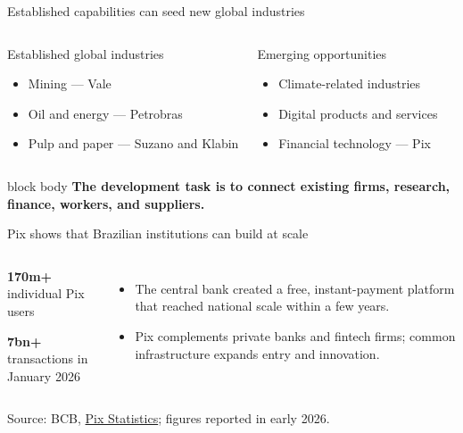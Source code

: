 \documentclass[10pt,aspectratio=169]{beamer}
\newcommand{\source}[1]{%
  \par\vfill{\tiny\color{MidGray}Source: #1}}
\newcommand{\muted}[1]{\textcolor{MidGray}{#1}}
\newcommand{\question}[1]{%
  \begin{beamercolorbox}[rounded=true,sep=0.55em,wd=\textwidth]{block body}
    \centering\large\textbf{#1}
  \end{beamercolorbox}}
\begin{document}
\begin{frame}{Established capabilities can seed new global industries}
  \begin{columns}[T,onlytextwidth]
      \begin{block}{Established global industries}
        \begin{itemize}
          \item Mining --- Vale
          \item Oil and energy --- Petrobras
          \item Pulp and paper --- Suzano and Klabin
        \end{itemize}
      \end{block}
      \begin{exampleblock}{Emerging opportunities}
        \begin{itemize}
          \item Climate-related industries
          \item Digital products and services
          \item Financial technology --- Pix
        \end{itemize}
      \end{exampleblock}
  \end{columns}
  \vspace{.4cm}
  \question{The development task is to connect existing firms, research, finance, workers, and suppliers.}
\end{frame}

\begin{frame}{Pix shows that Brazilian institutions can build at scale}
  \begin{columns}[T,onlytextwidth]
      \begin{center}
        {\fontsize{32}{36}\selectfont\color{DeepNavy}\textbf{170m+}}\\[-.1cm]
        \muted{individual Pix users}
        \vspace{.55cm}

        {\fontsize{32}{36}\selectfont\color{BrazilGreen}\textbf{7bn+}}\\[-.1cm]
        \muted{transactions in January 2026}
      \end{center}
      \begin{itemize}
        \item The central bank created a free, instant-payment platform that reached national scale within a few years.
        \item Pix complements private banks and fintech firms; common infrastructure expands entry and innovation.
      \end{itemize}
  \end{columns}
  \source{BCB, \href{https://www.bcb.gov.br/estabilidadefinanceira/estatisticaspix}{Pix Statistics}; figures reported in early 2026.}
\end{frame}
\end{document}
